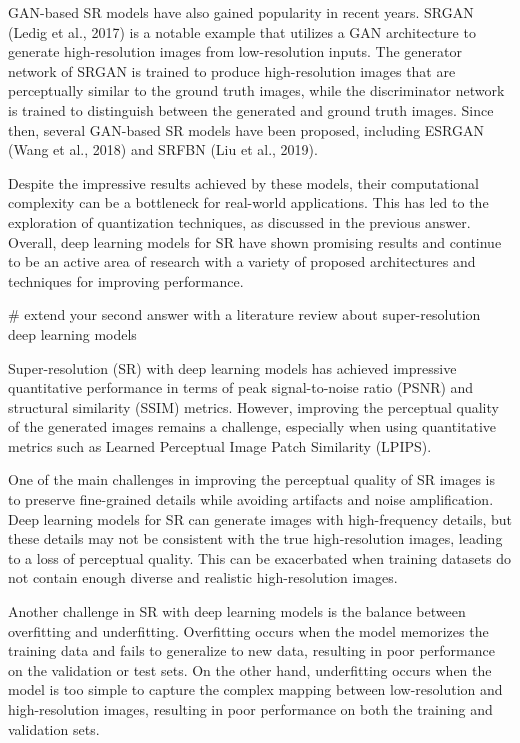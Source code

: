 GAN-based SR models have also gained popularity in recent years. SRGAN (Ledig et al., 2017) is a notable example that utilizes a GAN architecture to generate high-resolution images from low-resolution inputs. The generator network of SRGAN is trained to produce high-resolution images that are perceptually similar to the ground truth images, while the discriminator network is trained to distinguish between the generated and ground truth images. Since then, several GAN-based SR models have been proposed, including ESRGAN (Wang et al., 2018) and SRFBN (Liu et al., 2019).

Despite the impressive results achieved by these models, their computational complexity can be a bottleneck for real-world applications. This has led to the exploration of quantization techniques, as discussed in the previous answer. Overall, deep learning models for SR have shown promising results and continue to be an active area of research with a variety of proposed architectures and techniques for improving performance.

# extend your second answer with a literature review about super-resolution deep learning models

Super-resolution (SR) with deep learning models has achieved impressive quantitative performance in terms of peak signal-to-noise ratio (PSNR) and structural similarity (SSIM) metrics. However, improving the perceptual quality of the generated images remains a challenge, especially when using quantitative metrics such as Learned Perceptual Image Patch Similarity (LPIPS).

One of the main challenges in improving the perceptual quality of SR images is to preserve fine-grained details while avoiding artifacts and noise amplification. Deep learning models for SR can generate images with high-frequency details, but these details may not be consistent with the true high-resolution images, leading to a loss of perceptual quality. This can be exacerbated when training datasets do not contain enough diverse and realistic high-resolution images.

Another challenge in SR with deep learning models is the balance between overfitting and underfitting. Overfitting occurs when the model memorizes the training data and fails to generalize to new data, resulting in poor performance on the validation or test sets. On the other hand, underfitting occurs when the model is too simple to capture the complex mapping between low-resolution and high-resolution images, resulting in poor performance on both the training and validation sets.

